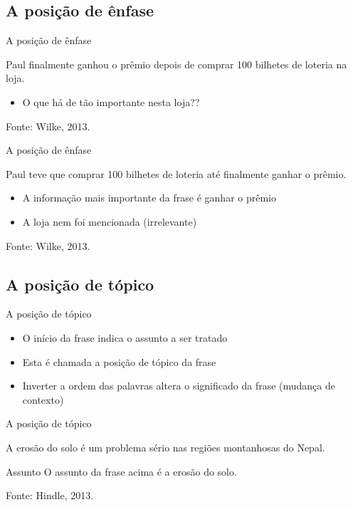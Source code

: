 \documentclass{beamer}
\begin{document}
\subsection{A posição de ênfase}

\begin{frame}{A posição de ênfase}
  \begin{example}
    Paul finalmente ganhou o prêmio depois de comprar 100 bilhetes de
    loteria \alert<2->{na loja}.
  \end{example}
    \begin{itemize}
    \item O que há de tão importante nesta loja??
    \end{itemize}

  \vfill
  Fonte: Wilke, 2013.
\end{frame}

\begin{frame}{A posição de ênfase}
  \begin{example}
      Paul teve que comprar 100 bilhetes de loteria até finalmente
      \alert<2->{ganhar o prêmio}.
  \end{example}
  \begin{itemize}
  \item A informação mais importante da frase é \alert{ganhar o
      prêmio}
  \item A loja nem foi mencionada (irrelevante)
  \end{itemize}


  \vfill
  Fonte: Wilke, 2013.
\end{frame}

\subsection{A posição de tópico}

\begin{frame}{A posição de tópico}
  \begin{itemize}
  \item O início da frase indica o assunto a ser tratado
  \item Esta é chamada a \alert{posição de tópico} da frase
  \item Inverter a ordem das palavras altera o significado da frase
    (mudança de contexto)
  \end{itemize}
\end{frame}

\begin{frame}{A posição de tópico}
  \begin{example}
    A \alert<3->{erosão do solo} é um problema sério nas regiões
    montanhosas do Nepal.
  \end{example}
  \begin{block}{Assunto}
    O assunto da frase acima é a \alert<3->{erosão do solo}.
  \end{block}

  \vfill
  Fonte: Hindle, 2013.
\end{frame}
\end{document}
